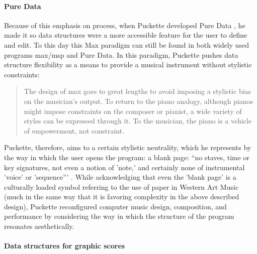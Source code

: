 	\paragraph{Pure Data}
	\label{computer:puredata}

	Because of this emphasis on process, when Puckette developed Pure Data \parencite{icmc/bbp2372.1997.060}, he made it so data structures were a more accessible feature for the user to define and edit. To this day this Max paradigm \parencite{DBLP:journals/comj/Puckette02} can still be found in both widely used programs \gls{max/msp} \parencite{DBLP:conf/icmc/Zicarelli98} and Pure Data. In this paradigm, Puckette pushes data structure flexibility as a means to provide a musical instrument without stylistic constraints:

	\begin{quote}
		The design of \gls{max} goes to great lengths to avoid imposing a stylistic bias on the musician's output. To return to the piano analogy, although pianos might impose constraints on the composer or pianist, a wide variety of styles can be expressed through it. To the musician, the piano is a vehicle of empowerment, not constraint. \parencite{DBLP:journals/comj/Puckette02}
	\end{quote}

	Puckette, therefore, aims to a certain stylistic neutrality, which he represents by the way in which the user opens the program: a blank page: ``no staves, time or key signatures, not even a notion of 'note,' and certainly none of instrumental 'voice' or 'sequence''' \parencite{DBLP:journals/comj/Puckette02}. While acknowledging that even the 'blank page' is a culturally loaded symbol referring to the use of paper in Western Art Music (much in the same way that it is favoring complexity in the above described design), Puckette reconfigured computer music design, composition, and performance by considering the way in which the structure of the program resonates aesthetically.

	\paragraph{Data structures for graphic scores}
	\label{computer:datastructures}



